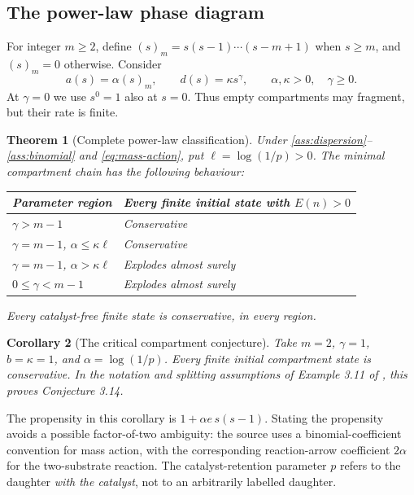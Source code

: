 \documentclass[11pt,a4paper]{article}
\newtheorem{theorem}{Theorem}
\newtheorem{corollary}[theorem]{Corollary}
\theoremstyle{remark}\newtheorem{remark}[theorem]{Remark}
\begin{document}
\subsection{The power-law phase diagram}

For integer $m\ge2$, define $(s)_m=s(s-1)\cdots(s-m+1)$ when $s\ge m$, and $(s)_m=0$ otherwise. Consider
\begin{equation}\label{eq:mass-action}
a(s)=\alpha(s)_m,\qquad d(s)=\kappa s^\gamma,
\qquad \alpha,\kappa>0,\quad\gamma\ge0.
\end{equation}
At $\gamma=0$ we use $s^0=1$ also at $s=0$. Thus empty compartments may fragment, but their rate is finite.

\begin{theorem}[Complete power-law classification]\label{thm:power}
Under \ref{ass:dispersion}--\ref{ass:binomial} and \eqref{eq:mass-action}, put $\ell=\log(1/p)>0$. The minimal compartment chain has the following behaviour:
\begin{center}
\begin{tabular}{@{}ll@{}}
\toprule
Parameter region & Every finite initial state with $E(n)>0$\\
\midrule
$\gamma>m-1$ & Conservative\\
$\gamma=m-1$, $\alpha\le\kappa\ell$ & Conservative\\
$\gamma=m-1$, $\alpha>\kappa\ell$ & Explodes almost surely\\
$0\le\gamma<m-1$ & Explodes almost surely\\
\bottomrule
\end{tabular}
\end{center}
Every catalyst-free finite state is conservative, in every region.
\end{theorem}

\begin{corollary}[The critical compartment conjecture]\label{cor:source}
Take $m=2$, $\gamma=1$, $b=\kappa=1$, and $\alpha=\log(1/p)$. Every finite initial compartment state is conservative. In the notation and splitting assumptions of Example 3.11 of \cite{anderson2026}, this proves Conjecture 3.14.
\end{corollary}

The propensity in this corollary is $1+\alpha e\,s(s-1)$. Stating the propensity avoids a possible factor-of-two ambiguity: the source uses a binomial-coefficient convention for mass action, with the corresponding reaction-arrow coefficient $2\alpha$ for the two-substrate reaction. The catalyst-retention parameter $p$ refers to the daughter \emph{with the catalyst}, not to an arbitrarily labelled daughter.
\end{document}

